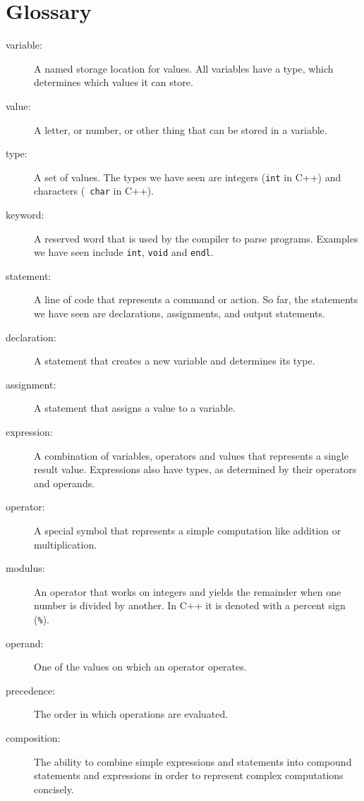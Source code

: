 \section{Glossary}
\begin{description}

\item[variable:] A named storage location for values.  All
variables have a type, which determines which values it can
store.

\item[value:] A letter, or number, or other thing that can be
stored in a variable.  

\item[type:] A set of values.  The types
we have seen are integers ({\tt int} in C++) and characters ({\tt
char} in C++).

\item[keyword:]  A reserved word that is used by the compiler
to parse programs.  Examples we have seen include {\tt int},
{\tt void} and {\tt endl}.

\item[statement:] A line of code that represents a command or
action.  So far, the statements we have seen are declarations,
assignments, and output statements.

\item[declaration:] A statement that creates a new variable and
determines its type.

\item[assignment:] A statement that assigns a value to a variable.

\item[expression:] A combination of variables, operators and
values that represents a single result value.  Expressions also
have types, as determined by their operators and operands.

\item[operator:] A special symbol that represents a simple
computation like addition or multiplication.

\item[modulus:]  An operator that works on integers and yields
the remainder when one number is divided by another.  In C++
it is denoted with a percent sign ({\tt \%}).

\item[operand:] One of the values on which an operator operates. 

\item[precedence:] The order in which operations are evaluated.

\item[composition:] The ability to combine simple
expressions and statements into compound statements and expressions
in order to represent complex computations concisely.


\end{description}


